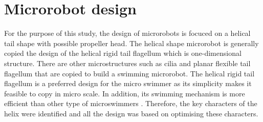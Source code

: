\documentclass[12pt,a4paper,titlepage]{report}
\begin{document}
\section{Microrobot design} \label{microDesign}

For the purpose of this study, the design of microrobots is focuced on a helical 
tail shape with possible propeller head. The helical shape microrobot is generally copied the design of the helical 
rigid tail flagellum which is one-dimensional structure. There are other microstructures 
such as cilia and planar flexible tail flagellum that are copied to build a swimming microrobot. The 
helical rigid tail flagellum is a preferred design for the micro swimmer as its simplicity makes
 it feasible to copy in micro scale. In addition, its swimming mechanism is more efficient than 
other type of microswimmers \citep{peyer2013bio}. 
Therefore, the key characters of the helix were 
identified and all the design was based on optimising these characters. 
\end{document}
